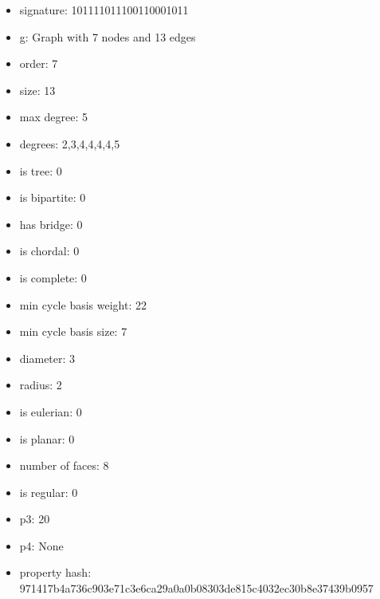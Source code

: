 \begin{itemize}
\item signature: 101111011100110001011
\item g: Graph with 7 nodes and 13 edges
\item order: 7
\item size: 13
\item max degree: 5
\item degrees: 2,3,4,4,4,4,5
\item is tree: 0
\item is bipartite: 0
\item has bridge: 0
\item is chordal: 0
\item is complete: 0
\item min cycle basis weight: 22
\item min cycle basis size: 7
\item diameter: 3
\item radius: 2
\item is eulerian: 0
\item is planar: 0
\item number of faces: 8
\item is regular: 0
\item p3: 20
\item p4: None
\item property hash: 971417b4a736c903e71c3e6ca29a0a0b08303de815c4032ec30b8e37439b0957
\end{itemize}
\newpage
\begin{figure}
\end{figure}
